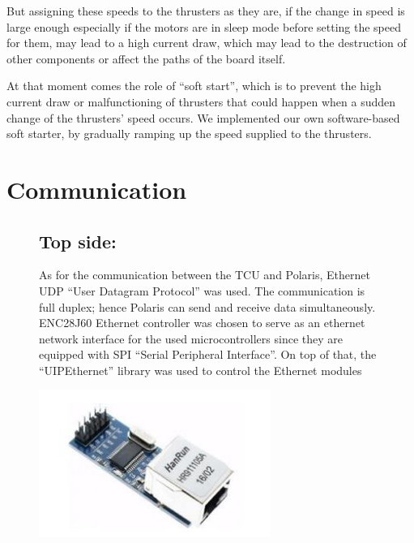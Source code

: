 \documentclass[a4paper,10pt]{article}
\renewcommand{\thesubsection}{\arabic{subsection}}
\begin{document}
		But assigning these speeds to the thrusters as they are, if the change in speed is large enough
		especially if the motors are in sleep mode before setting the speed for them, may lead to a high
		current draw, which may lead to the destruction of other components or affect the paths of the
		board itself.
		
		At that moment comes the role of “soft start”, which is to prevent the high current draw or
		malfunctioning of thrusters that could happen when a sudden change of the thrusters’ speed
		occurs. We implemented our own software-based soft starter, by gradually ramping up the
		speed supplied to the thrusters.
	
	\section{Communication}
	\renewcommand{\thesubsection}{\Roman{subsection}}
	\begin{figure}[H]
		\begin{minipage}{0.65\textwidth}
			\subsection{Top side:}	
			As for the communication between the TCU and Polaris, Ethernet UDP “User 
			Datagram Protocol” was used. The communication is full duplex; hence 
			Polaris can send and receive data simultaneously. ENC28J60 Ethernet 
			controller was chosen to serve as an ethernet network interface for the used 
			microcontrollers since they are equipped with SPI “Serial Peripheral 
			Interface”. On top of that, the “UIPEthernet” library was used to control the 
			Ethernet modules
		\end{minipage}
		\hfill
		\begin{minipage}{0.3\textwidth} 
			\centering
			\includegraphics[width=\textwidth]{ethernet_module}
		\end{minipage}
	\end{figure}
\end{document}
